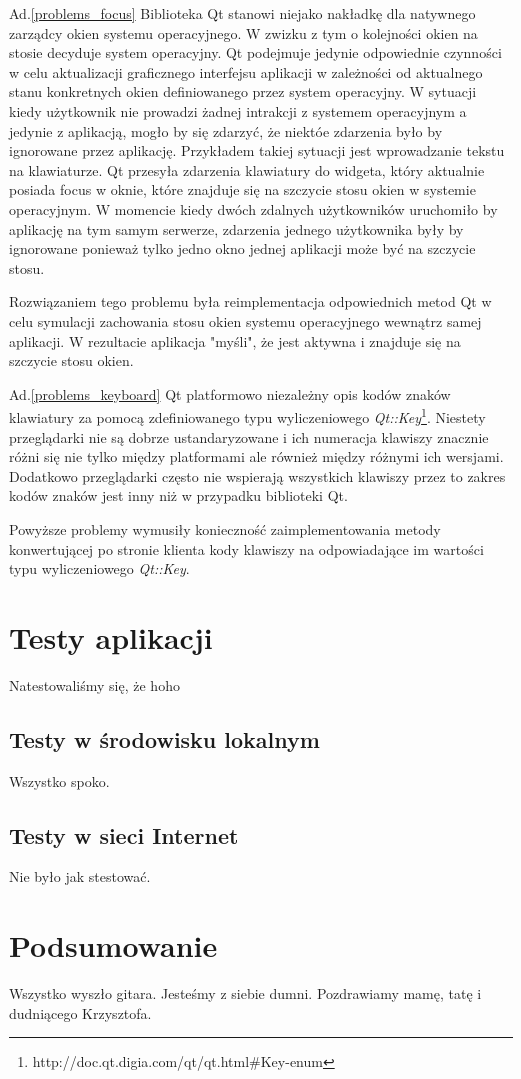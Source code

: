 \documentclass[polish]{inz}
\begin{document}
Ad.\ref{problems_focus} Biblioteka Qt stanowi niejako nakładkę dla natywnego zarządcy okien systemu operacyjnego. W zwizku z tym o kolejności okien na stosie decyduje system operacyjny. Qt podejmuje jedynie odpowiednie czynności w celu aktualizacji graficznego interfejsu aplikacji w zależności od aktualnego stanu konkretnych okien definiowanego przez system operacyjny. W sytuacji kiedy użytkownik nie prowadzi żadnej intrakcji z systemem operacyjnym a jedynie z aplikacją, mogło by się zdarzyć, że niektóe zdarzenia było by ignorowane przez aplikację. Przykładem takiej sytuacji jest wprowadzanie tekstu na klawiaturze. Qt przesyła zdarzenia klawiatury do widgeta, który aktualnie posiada focus w oknie, które znajduje się na szczycie stosu okien w systemie operacyjnym. W momencie kiedy dwóch zdalnych użytkowników uruchomiło by aplikację na tym samym serwerze, zdarzenia jednego użytkownika były by ignorowane ponieważ tylko jedno okno jednej aplikacji może być na szczycie stosu. 

Rozwiązaniem tego problemu była reimplementacja odpowiednich metod Qt w celu symulacji zachowania stosu okien systemu operacyjnego wewnątrz samej aplikacji. W rezultacie aplikacja "myśli", że jest aktywna i znajduje się na szczycie stosu okien.

Ad.\ref{problems_keyboard} 
Qt platformowo niezależny opis kodów znaków klawiatury za pomocą zdefiniowanego typu wyliczeniowego \emph{Qt::Key}\footnote{http://doc.qt.digia.com/qt/qt.html\#Key-enum}. Niestety przeglądarki nie są dobrze ustandaryzowane i ich numeracja klawiszy znacznie różni się nie tylko między platformami ale również między różnymi ich wersjami. Dodatkowo przeglądarki często nie wspierają wszystkich klawiszy przez to zakres kodów znaków jest inny niż w przypadku biblioteki Qt.

Powyższe problemy wymusiły konieczność zaimplementowania metody konwertującej po stronie klienta kody klawiszy na odpowiadające im wartości typu wyliczeniowego \emph{Qt::Key}.

\chapter{Testy aplikacji}
Natestowaliśmy się, że hoho

\section{Testy w środowisku lokalnym}
Wszystko spoko.

\section{Testy w sieci Internet}
Nie było jak stestować.

\chapter{Podsumowanie}
Wszystko wyszło gitara. Jesteśmy z siebie dumni. Pozdrawiamy mamę, tatę i dudniącego Krzysztofa.

\printindex
\end{document}
